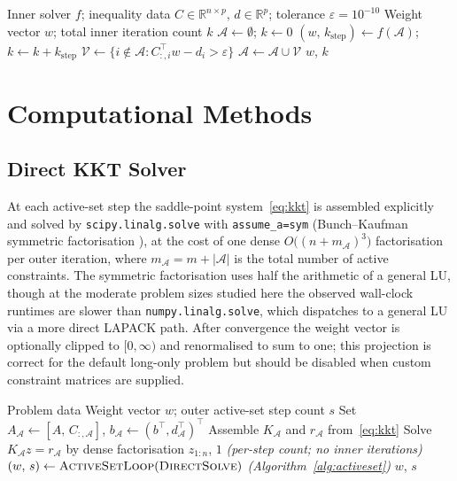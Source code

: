 \documentclass{siam/siamart}
\begin{document}
\begin{algorithm}[ht]
\caption{Active-set loop}\label{alg:activeset}
\begin{algorithmic}[1]
\Require Inner solver $f$;\; inequality data $C \in \mathbb{R}^{n \times p}$, $d \in \mathbb{R}^p$;\; tolerance $\varepsilon = 10^{-10}$
\Ensure Weight vector $w$;\; total inner iteration count $k$
\State $\mathcal{A} \leftarrow \emptyset$;\; $k \leftarrow 0$
\Repeat
  \State $(w,\, k_{\mathrm{step}}) \leftarrow f(\mathcal{A})$;\; $k \leftarrow k + k_{\mathrm{step}}$
  \State $\mathcal{V} \leftarrow \{i \notin \mathcal{A} : C_{:,i}^\top w - d_i > \varepsilon\}$
  \State $\mathcal{A} \leftarrow \mathcal{A} \cup \mathcal{V}$
\State \Return $w$, $k$
\end{algorithmic}
\end{algorithm}

\section{Computational Methods}\label{sec:solvers}

\subsection{Direct KKT Solver}

At each active-set step the saddle-point system~\eqref{eq:kkt} is assembled
explicitly and solved by \texttt{scipy.linalg.solve} with
\texttt{assume\_a=\textquotesingle{}sym\textquotesingle{}} (Bunch--Kaufman symmetric
factorisation \cite{bunch1977}), at the cost of one dense $O\!\bigl((n+m_\mathcal{A})^3\bigr)$
factorisation per outer iteration, where $m_\mathcal{A} = m + |\mathcal{A}|$ is the
total number of active constraints.  The symmetric factorisation uses half the arithmetic of a general LU,
though at the moderate problem sizes studied here the observed wall-clock runtimes
are slower than \texttt{numpy.linalg.solve}, which dispatches to a general LU via
a more direct LAPACK path.
After convergence the weight vector is optionally clipped to $[0,\infty)$ and
renormalised to sum to one; this projection is correct for the default long-only
problem but should be disabled when custom constraint matrices are supplied.

\begin{algorithm}[ht]
\caption{Direct KKT solver}\label{alg:kkt}
\begin{algorithmic}[1]
\Require Problem data
\Ensure Weight vector $w$;\; outer active-set step count $s$
  \State Set $A_{\mathcal{A}} \leftarrow [A,\, C_{:,\mathcal{A}}]$,\; $b_{\mathcal{A}} \leftarrow (b^\top, d_{\mathcal{A}}^\top)^\top$
  \State Assemble $K_{\mathcal{A}}$ and $r_{\mathcal{A}}$ from~\eqref{eq:kkt}
  \State Solve $K_{\mathcal{A}} z = r_{\mathcal{A}}$ by dense factorisation
  \State \Return $z_{1:n}$,\; $1$  \hfill\textit{(per-step count; no inner iterations)}
\EndFunction
\State $(w,\, s) \leftarrow \textsc{ActiveSetLoop}(\textsc{DirectSolve})$
  \hfill\textit{(Algorithm~\ref{alg:activeset})}
\State \Return $w$, $s$
\end{algorithmic}
\end{algorithm}
\end{document}

